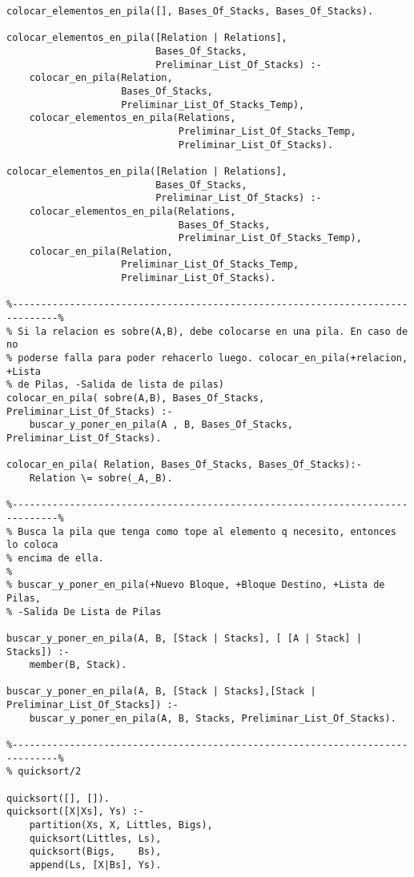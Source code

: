 \documentclass[a4paper,12pt]{report}
\begin{document}
\begin{footnotesize}
\begin{verbatim}
colocar_elementos_en_pila([], Bases_Of_Stacks, Bases_Of_Stacks).

colocar_elementos_en_pila([Relation | Relations], 
                          Bases_Of_Stacks, 
                          Preliminar_List_Of_Stacks) :-
    colocar_en_pila(Relation, 
                    Bases_Of_Stacks, 
                    Preliminar_List_Of_Stacks_Temp),
    colocar_elementos_en_pila(Relations, 
                              Preliminar_List_Of_Stacks_Temp, 
                              Preliminar_List_Of_Stacks).

colocar_elementos_en_pila([Relation | Relations], 
                          Bases_Of_Stacks, 
                          Preliminar_List_Of_Stacks) :-
    colocar_elementos_en_pila(Relations, 
                              Bases_Of_Stacks, 
                              Preliminar_List_Of_Stacks_Temp),
    colocar_en_pila(Relation, 
                    Preliminar_List_Of_Stacks_Temp, 
                    Preliminar_List_Of_Stacks).

%------------------------------------------------------------------------------%
% Si la relacion es sobre(A,B), debe colocarse en una pila. En caso de no 
% poderse falla para poder rehacerlo luego. colocar_en_pila(+relacion, +Lista 
% de Pilas, -Salida de lista de pilas)   
colocar_en_pila( sobre(A,B), Bases_Of_Stacks, Preliminar_List_Of_Stacks) :-
    buscar_y_poner_en_pila(A , B, Bases_Of_Stacks, Preliminar_List_Of_Stacks).
    
colocar_en_pila( Relation, Bases_Of_Stacks, Bases_Of_Stacks):-
    Relation \= sobre(_A,_B).

%------------------------------------------------------------------------------%
% Busca la pila que tenga como tope al elemento q necesito, entonces lo coloca 
% encima de ella.
%   
% buscar_y_poner_en_pila(+Nuevo Bloque, +Bloque Destino, +Lista de Pilas, 
% -Salida De Lista de Pilas

buscar_y_poner_en_pila(A, B, [Stack | Stacks], [ [A | Stack] | Stacks]) :-
    member(B, Stack).

buscar_y_poner_en_pila(A, B, [Stack | Stacks],[Stack | Preliminar_List_Of_Stacks]) :-
    buscar_y_poner_en_pila(A, B, Stacks, Preliminar_List_Of_Stacks).

%------------------------------------------------------------------------------%
% quicksort/2

quicksort([], []).
quicksort([X|Xs], Ys) :-
    partition(Xs, X, Littles, Bigs),
    quicksort(Littles, Ls),
    quicksort(Bigs,    Bs),
    append(Ls, [X|Bs], Ys).


\end{verbatim}
\end{footnotesize}
\end{document}
